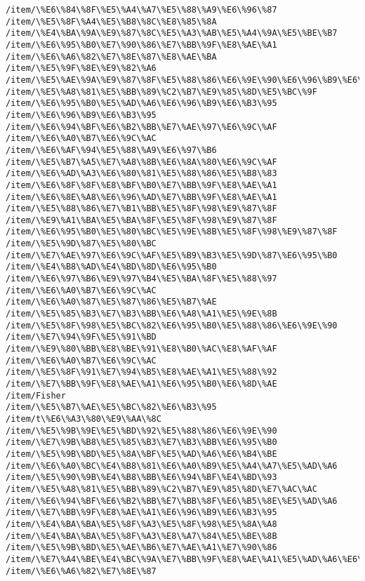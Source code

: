 \documentclass[11pt]{article}
\begin{document}
    \begin{Verbatim}[commandchars=\\\{\}]
/item/\%E6\%84\%8F\%E5\%A4\%A7\%E5\%88\%A9\%E6\%96\%87
/item/\%E5\%8F\%A4\%E5\%B8\%8C\%E8\%85\%8A
/item/\%E4\%BA\%9A\%E9\%87\%8C\%E5\%A3\%AB\%E5\%A4\%9A\%E5\%BE\%B7
/item/\%E6\%95\%B0\%E7\%90\%86\%E7\%BB\%9F\%E8\%AE\%A1
/item/\%E6\%A6\%82\%E7\%8E\%87\%E8\%AE\%BA
/item/\%E5\%9F\%8E\%E9\%82\%A6
/item/\%E5\%AE\%9A\%E9\%87\%8F\%E5\%88\%86\%E6\%9E\%90\%E6\%96\%B9\%E6\%B3\%95
/item/\%E5\%A8\%81\%E5\%BB\%89\%C2\%B7\%E9\%85\%8D\%E5\%BC\%9F
/item/\%E6\%95\%B0\%E5\%AD\%A6\%E6\%96\%B9\%E6\%B3\%95
/item/\%E6\%96\%B9\%E6\%B3\%95
/item/\%E6\%94\%BF\%E6\%B2\%BB\%E7\%AE\%97\%E6\%9C\%AF
/item/\%E6\%A0\%B7\%E6\%9C\%AC
/item/\%E6\%AF\%94\%E5\%88\%A9\%E6\%97\%B6
/item/\%E5\%B7\%A5\%E7\%A8\%8B\%E6\%8A\%80\%E6\%9C\%AF
/item/\%E6\%AD\%A3\%E6\%80\%81\%E5\%88\%86\%E5\%B8\%83
/item/\%E6\%8F\%8F\%E8\%BF\%B0\%E7\%BB\%9F\%E8\%AE\%A1
/item/\%E6\%8E\%A8\%E6\%96\%AD\%E7\%BB\%9F\%E8\%AE\%A1
/item/\%E5\%88\%86\%E7\%B1\%BB\%E5\%8F\%98\%E9\%87\%8F
/item/\%E9\%A1\%BA\%E5\%BA\%8F\%E5\%8F\%98\%E9\%87\%8F
/item/\%E6\%95\%B0\%E5\%80\%BC\%E5\%9E\%8B\%E5\%8F\%98\%E9\%87\%8F
/item/\%E5\%9D\%87\%E5\%80\%BC
/item/\%E7\%AE\%97\%E6\%9C\%AF\%E5\%B9\%B3\%E5\%9D\%87\%E6\%95\%B0
/item/\%E4\%B8\%AD\%E4\%BD\%8D\%E6\%95\%B0
/item/\%E6\%97\%B6\%E9\%97\%B4\%E5\%BA\%8F\%E5\%88\%97
/item/\%E6\%A0\%B7\%E6\%9C\%AC
/item/\%E6\%A0\%87\%E5\%87\%86\%E5\%B7\%AE
/item/\%E5\%85\%B3\%E7\%B3\%BB\%E6\%A8\%A1\%E5\%9E\%8B
/item/\%E5\%8F\%98\%E5\%BC\%82\%E6\%95\%B0\%E5\%88\%86\%E6\%9E\%90
/item/\%E7\%94\%9F\%E5\%91\%BD
/item/\%E9\%80\%BB\%E8\%BE\%91\%E8\%B0\%AC\%E8\%AF\%AF
/item/\%E6\%A0\%B7\%E6\%9C\%AC
/item/\%E5\%8F\%91\%E7\%94\%B5\%E8\%AE\%A1\%E5\%88\%92
/item/\%E7\%BB\%9F\%E8\%AE\%A1\%E6\%95\%B0\%E6\%8D\%AE
/item/Fisher
/item/\%E5\%B7\%AE\%E5\%BC\%82\%E6\%B3\%95
/item/t\%E6\%A3\%80\%E9\%AA\%8C
/item/\%E5\%9B\%9E\%E5\%BD\%92\%E5\%88\%86\%E6\%9E\%90
/item/\%E7\%9B\%B8\%E5\%85\%B3\%E7\%B3\%BB\%E6\%95\%B0
/item/\%E5\%9B\%BD\%E5\%8A\%BF\%E5\%AD\%A6\%E6\%B4\%BE
/item/\%E6\%A0\%BC\%E4\%B8\%81\%E6\%A0\%B9\%E5\%A4\%A7\%E5\%AD\%A6
/item/\%E5\%90\%9B\%E4\%B8\%BB\%E6\%94\%BF\%E4\%BD\%93
/item/\%E5\%A8\%81\%E5\%BB\%89\%C2\%B7\%E9\%85\%8D\%E7\%AC\%AC
/item/\%E6\%94\%BF\%E6\%B2\%BB\%E7\%BB\%8F\%E6\%B5\%8E\%E5\%AD\%A6
/item/\%E7\%BB\%9F\%E8\%AE\%A1\%E6\%96\%B9\%E6\%B3\%95
/item/\%E4\%BA\%BA\%E5\%8F\%A3\%E5\%8F\%98\%E5\%8A\%A8
/item/\%E4\%BA\%BA\%E5\%8F\%A3\%E8\%A7\%84\%E5\%BE\%8B
/item/\%E5\%9B\%BD\%E5\%AE\%B6\%E7\%AE\%A1\%E7\%90\%86
/item/\%E7\%A4\%BE\%E4\%BC\%9A\%E7\%BB\%9F\%E8\%AE\%A1\%E5\%AD\%A6\%E6\%B4\%BE
/item/\%E6\%A6\%82\%E7\%8E\%87

\end{Verbatim}
\end{document}

